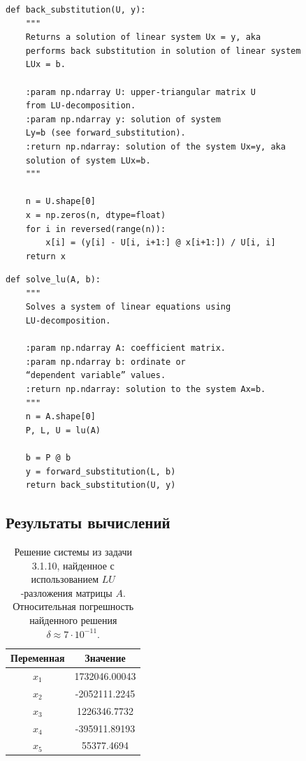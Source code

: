 \documentclass[12pt]{article}%
\begin{document}
\begin{verbatim}
def back_substitution(U, y):
    """
    Returns a solution of linear system Ux = y, aka 
    performs back substitution in solution of linear system 
    LUx = b.

    :param np.ndarray U: upper-triangular matrix U 
    from LU-decomposition.
    :param np.ndarray y: solution of system 
    Ly=b (see forward_substitution).
    :return np.ndarray: solution of the system Ux=y, aka 
    solution of system LUx=b.
    """
    
    n = U.shape[0]
    x = np.zeros(n, dtype=float)
    for i in reversed(range(n)):
        x[i] = (y[i] - U[i, i+1:] @ x[i+1:]) / U[i, i]
    return x
\end{verbatim}


\begin{verbatim}
def solve_lu(A, b):
    """
    Solves a system of linear equations using 
    LU-decomposition.

    :param np.ndarray A: coefficient matrix.
    :param np.ndarray b: ordinate or 
    “dependent variable” values.
    :return np.ndarray: solution to the system Ax=b. 
    """
    n = A.shape[0]
    P, L, U = lu(A)

    b = P @ b
    y = forward_substitution(L, b)
    return back_substitution(U, y)
\end{verbatim}


\subsection{Результаты вычислений}
\begin{table}[h]
    \centering
    \begin{tabular}{|c|c|}
        \hline  Переменная & Значение \\
        \hline  $x_1$      & 1732046.00043  \\
        \hline  $x_2$      & -2052111.2245  \\
        \hline  $x_3$      & 1226346.7732   \\
        \hline  $x_4$      & -395911.89193  \\
        \hline  $x_5$      & 55377.4694     \\
        \hline
    \end{tabular}
    \caption{Решение системы из задачи 3.1.10, найденное с использованием $LU$-разложения матрицы $A$. Относительная погрешность найденного решения $\delta \approx 7 \cdot 10^{-11} $.}
\end{table}
\end{document}
